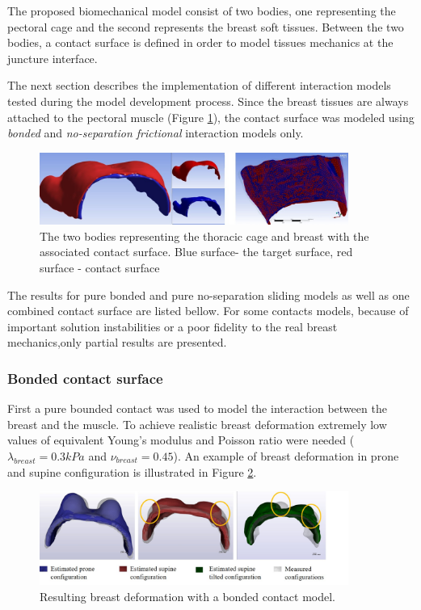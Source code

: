 The proposed biomechanical model consist of two bodies, one representing the pectoral cage  and the second represents the breast soft tissues. Between the two bodies, a contact surface is defined in order to model tissues mechanics at the juncture interface.
 
The next section describes the implementation of different interaction models tested during the model development process. Since the breast tissues are always attached to the pectoral muscle (Figure \ref{fig:contactsurface}), the contact surface was modeled using \textit{bonded} and \textit{no-separation frictional} interaction models only.

\begin{figure}[!h]
\centering
\includegraphics[width=0.9\textwidth,keepaspectratio]{figures/contactSurface.jpg} 
\caption{The two bodies representing the thoracic cage and breast with the associated contact surface.  Blue surface- the target surface, red surface - contact surface}
\label{fig:contactsurface}
\end{figure}

The results for pure bonded and pure no-separation sliding models as well as one combined contact surface are listed bellow. For some contacts models, because of important solution instabilities or a poor fidelity to the real breast mechanics,only partial results are presented.  

\subsubsection*{Bonded contact surface}

First a pure bounded contact was used to model the interaction between the breast and the muscle. To achieve realistic breast deformation extremely low values of equivalent Young's modulus and Poisson ratio were needed ($\lambda_{breast} = 0.3kPa$ and $\nu_{breast} = 0.45$).  
An example of breast deformation in prone and supine configuration is illustrated in Figure \ref{fig:bondedcontact}.

\begin{figure}[!h]
\centering
\includegraphics[width=0.9\textwidth,keepaspectratio]{figures/bondedcontact.jpg} 
\caption{Resulting breast deformation with a bonded contact model.}
\label{fig:bondedcontact}
\end{figure}


